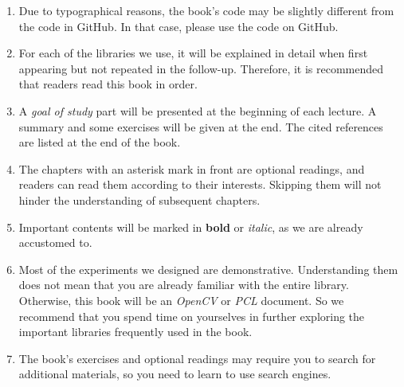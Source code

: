 \begin{English}
\begin{enumerate}
    	\item Due to typographical reasons, the book's code may be slightly different from the code in GitHub. In that case, please use the code on GitHub.
    
    	\item For each of the libraries we use, it will be explained in detail when first appearing but not repeated in the follow-up. Therefore, it is recommended that readers read this book in order.
    
    	\item A \textit{goal of study} part will be presented at the beginning of each lecture. A summary and some exercises will be given at the end. The cited references are listed at the end of the book.
    
    	\item The chapters with an asterisk mark in front are optional readings, and readers can read them according to their interests. Skipping them will not hinder the understanding of subsequent chapters.
    
    	\item Important contents will be marked in \textbf{bold} or \emph{italic}, as we are already accustomed to.
    
    	\item Most of the experiments we designed are demonstrative. Understanding them does not mean that you are already familiar with the entire library. Otherwise, this book will be an \textit{OpenCV} or \textit{PCL} document. So we recommend that you spend time on yourselves in further exploring the important libraries frequently used in the book.
    
    	\item The book's exercises and optional readings may require you to search for additional materials, so you need to learn to use search engines.
    \end{enumerate}
\end{English}

